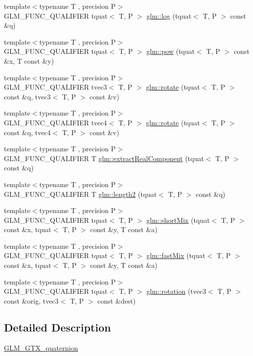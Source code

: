 \begin{DoxyCompactItemize}
\item 
{\footnotesize template$<$typename T , precision P$>$ }\\G\+L\+M\+\_\+\+F\+U\+N\+C\+\_\+\+Q\+U\+A\+L\+I\+F\+I\+ER tquat$<$ T, P $>$ \hyperlink{group__gtx__quaternion_ga791f42e134bfe97fc9c96f4668dd7489}{glm\+::log} (tquat$<$ T, P $>$ const \&q)
\item 
{\footnotesize template$<$typename T , precision P$>$ }\\G\+L\+M\+\_\+\+F\+U\+N\+C\+\_\+\+Q\+U\+A\+L\+I\+F\+I\+ER tquat$<$ T, P $>$ \hyperlink{group__gtx__quaternion_ga42a0cf206c59eaeff4c67dd62e09a580}{glm\+::pow} (tquat$<$ T, P $>$ const \&x, T const \&y)
\item 
{\footnotesize template$<$typename T , precision P$>$ }\\G\+L\+M\+\_\+\+F\+U\+N\+C\+\_\+\+Q\+U\+A\+L\+I\+F\+I\+ER tvec3$<$ T, P $>$ \hyperlink{group__gtx__quaternion_ga9f39f0d3ecd66839a4af44560aa10fb2}{glm\+::rotate} (tquat$<$ T, P $>$ const \&q, tvec3$<$ T, P $>$ const \&v)
\item 
{\footnotesize template$<$typename T , precision P$>$ }\\G\+L\+M\+\_\+\+F\+U\+N\+C\+\_\+\+Q\+U\+A\+L\+I\+F\+I\+ER tvec4$<$ T, P $>$ \hyperlink{group__gtx__quaternion_ga96575f8868b3f2aa3e13cab9b94ccbd3}{glm\+::rotate} (tquat$<$ T, P $>$ const \&q, tvec4$<$ T, P $>$ const \&v)
\item 
{\footnotesize template$<$typename T , precision P$>$ }\\G\+L\+M\+\_\+\+F\+U\+N\+C\+\_\+\+Q\+U\+A\+L\+I\+F\+I\+ER T \hyperlink{group__gtx__quaternion_ga90de879d97487ec804522dd418e5d8a0}{glm\+::extract\+Real\+Component} (tquat$<$ T, P $>$ const \&q)
\item 
{\footnotesize template$<$typename T , precision P$>$ }\\G\+L\+M\+\_\+\+F\+U\+N\+C\+\_\+\+Q\+U\+A\+L\+I\+F\+I\+ER T \hyperlink{group__gtx__quaternion_ga02b45352c7ac345cabc9e877314acda6}{glm\+::length2} (tquat$<$ T, P $>$ const \&q)
\item 
{\footnotesize template$<$typename T , precision P$>$ }\\G\+L\+M\+\_\+\+F\+U\+N\+C\+\_\+\+Q\+U\+A\+L\+I\+F\+I\+ER tquat$<$ T, P $>$ \hyperlink{group__gtx__quaternion_ga3534443de2a1a806f386976546cddc81}{glm\+::short\+Mix} (tquat$<$ T, P $>$ const \&x, tquat$<$ T, P $>$ const \&y, T const \&a)
\item 
{\footnotesize template$<$typename T , precision P$>$ }\\G\+L\+M\+\_\+\+F\+U\+N\+C\+\_\+\+Q\+U\+A\+L\+I\+F\+I\+ER tquat$<$ T, P $>$ \hyperlink{group__gtx__quaternion_gac11bf550f17d1da14423595a27575084}{glm\+::fast\+Mix} (tquat$<$ T, P $>$ const \&x, tquat$<$ T, P $>$ const \&y, T const \&a)
\item 
{\footnotesize template$<$typename T , precision P$>$ }\\G\+L\+M\+\_\+\+F\+U\+N\+C\+\_\+\+Q\+U\+A\+L\+I\+F\+I\+ER tquat$<$ T, P $>$ \hyperlink{group__gtx__quaternion_gac4856d356c5c97cec74e9b672ea89240}{glm\+::rotation} (tvec3$<$ T, P $>$ const \&orig, tvec3$<$ T, P $>$ const \&dest)
\end{DoxyCompactItemize}


\subsection{Detailed Description}
\hyperlink{group__gtx__quaternion}{G\+L\+M\+\_\+\+G\+T\+X\+\_\+quaternion} 